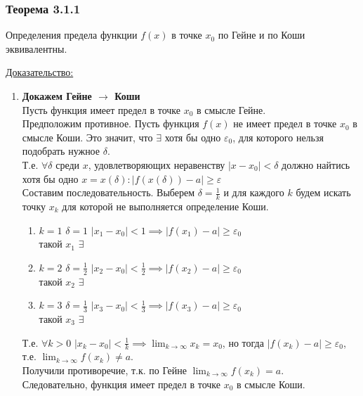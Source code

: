 \documentclass[12pt]{article}
\begin{document}
    \subsubsection*{Теорема 3.1.1}\label{th:3.1.1}
    Определения предела функции $f(x)$ в точке $x_0$ по Гейне и по Коши эквивалентны.\par\noindent
    \underline{Доказательство:}
    \begin{adjustwidth}{1.5em}{1.5em}
        \begin{enumerate}
            \item \textbf{Докажем Гейне $\rightarrow$ Коши}\\
            Пусть функция имеет предел в точке $x_0$ в смысле Гейне.\\
            Предположим противное. Пусть функция $f(x)$ не имеет предел в точке $x_0$ в смысле Коши. Это значит, что $\exists$ хотя бы одно $\varepsilon_0$, для которого нельзя подобрать нужное $\delta$.\\
            Т.е. $\forall \delta$ среди $x$, удовлетворяющих неравенству $|x-x_0| < \delta$ должно найтись хотя бы одно $x = x(\delta) : |f(x(\delta)) - a| \ge \varepsilon$\\
            Составим последовательность. Выберем $\delta = \frac{1}{k}$ и для каждого $k$ будем искать точку $x_k$ для которой не выполняется определение Коши.
            \begin{enumerate}
                \item $k = 1$ $\delta = 1$ $|x_1 - x_0| < 1 \implies |f(x_1) - a| \ge \varepsilon_0$\\
                такой $x_1$ $\exists$
                \item $k = 2$ $\delta = \frac{1}{2}$ $|x_2 - x_0| < \frac{1}{2} \implies |f(x_2) - a| \ge \varepsilon_0$\\
                такой $x_2$ $\exists$
                \item $k = 3$ $\delta = \frac{1}{3}$ $|x_3 - x_0| < \frac{1}{3} \implies |f(x_3) - a| \ge \varepsilon_0$\\
                такой $x_3$ $\exists$
            \end{enumerate}
            Т.е. $\forall k > 0$ $|x_k - x_0| < \frac{1}{k} \implies \lim_{k\to\infty} x_k = x_0$, но тогда $|f(x_k) - a| \ge \varepsilon_0$, т.е. $\lim_{k\to\infty} f(x_k) \ne a$.\\
            Получили противоречие, т.к. по Гейне $\lim_{k\to\infty} f(x_k) = a$.\\
            Следовательно, функция имеет предел в точке $x_0$ в смысле Коши.

\end{enumerate}
\end{adjustwidth}
\end{document}
